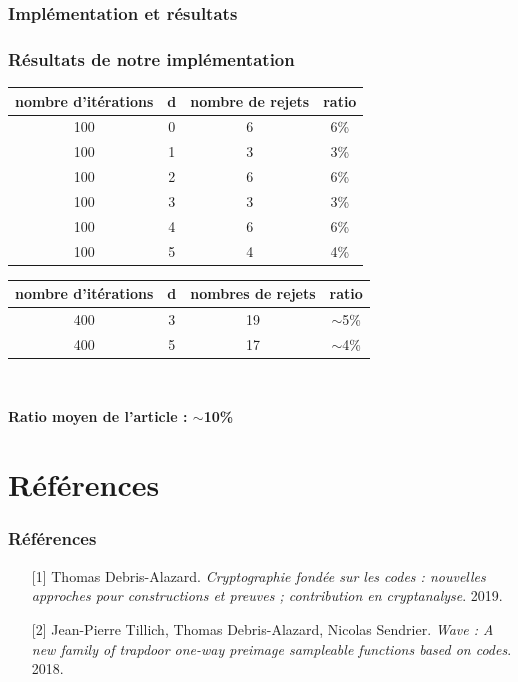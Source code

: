 \documentclass[10pt,a4paper]{beamer}
\theoremstyle{plain}
\theoremstyle{definition}
\begin{document}
\begin{frame}
\frametitle{Implémentation et résultats}
\frametitle{Résultats de notre implémentation}
\begin{center}
\begin{tabular}{|c|c|c|c|} 
\hline
\textbf{nombre d'itérations} & \textbf{d} & \textbf{nombre de rejets} & \textbf{ratio\;} \\\hline 
100 & 0 & 6 & 6\% \\\hline
100 & 1 & 3 & 3\% \\\hline 
100 & 2 & 6 & 6\% \\\hline
100 & 3 & 3 & 3\% \\\hline
100 & 4 & 6 & 6\% \\\hline
100 & 5 & 4 & 4\% \\\hline
\end{tabular}
\end{center}
\begin{center}
\begin{tabular}{|c|c|c|c|} 
\hline
\textbf{nombre d'itérations} & \textbf{d} & \textbf{nombres de rejets} & \textbf{ratio} \\\hline 
400 & 3 & 19 & $\sim$5\% \\\hline
400 & 5 & 17 & $\sim$4\%\\\hline 
\end{tabular}\

\vspace{0.2in}
\textbf{Ratio moyen de l'article : $\sim$10\%}
\end{center}
\end{frame}


\section{Références}




\begin{frame}
  \frametitle{Références}
  \begin{enumerate}
  \item[{[1]}] Thomas Debris-Alazard. \textit{Cryptographie fondée sur les codes : nouvelles approches pour constructions et preuves ; contribution en cryptanalyse}. 2019.
  \vspace{0.1in}
  \item[{[2]}] Jean-Pierre Tillich, Thomas Debris-Alazard, Nicolas Sendrier. \textit{Wave : A
new family of trapdoor one-way preimage sampleable functions based on codes}. 2018.
  \end{enumerate}
\end{frame}
\end{document}
